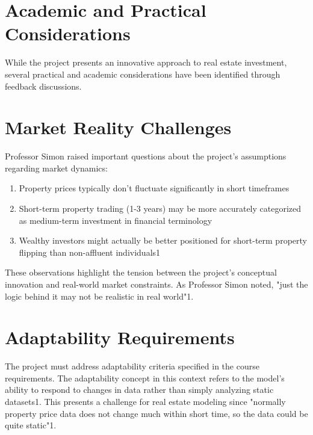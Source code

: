 \section*{Academic and Practical Considerations}

While the project presents an innovative approach to real estate investment, several practical and academic considerations have been identified through feedback discussions.


\section*{Market Reality Challenges}

Professor Simon raised important questions about the project's assumptions regarding market dynamics:


\begin{enumerate}

\item
Property prices typically don't fluctuate significantly in short timeframes




\item
Short-term property trading (1-3 years) may be more accurately categorized as medium-term investment in financial terminology




\item
Wealthy investors might actually be better positioned for short-term property flipping than non-affluent individuals1




\end{enumerate}

These observations highlight the tension between the project's conceptual innovation and real-world market constraints. As Professor Simon noted, "just the logic behind it may not be realistic in real world"1.


\section*{Adaptability Requirements}

The project must address adaptability criteria specified in the course requirements. The adaptability concept in this context refers to the model's ability to respond to changes in data rather than simply analyzing static datasets1. This presents a challenge for real estate modeling since "normally property price data does not change much within short time, so the data could be quite static"1.


